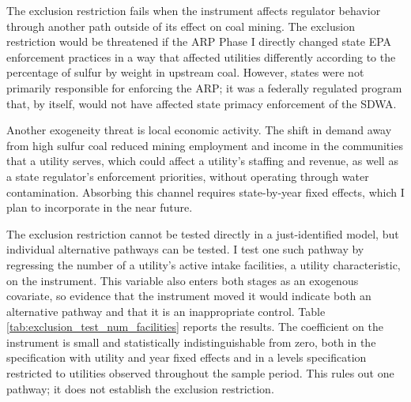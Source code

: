 \documentclass[12pt]{article}
\begin{document}

The exclusion restriction fails when the instrument affects regulator behavior through another path outside of its effect on coal mining. The exclusion restriction would be threatened if the ARP Phase I directly changed state EPA enforcement practices in a way that affected utilities differently according to the percentage of sulfur by weight in upstream coal. However, states were not primarily responsible for enforcing the ARP; it was a federally regulated program that, by itself, would not have affected state primacy enforcement of the SDWA. 

Another exogeneity threat is local economic activity. The shift in demand away from high sulfur coal reduced mining employment and income in the communities that a utility serves, which could affect a utility's staffing and revenue, as well as a state regulator's enforcement priorities, without operating through water contamination. Absorbing this channel requires state-by-year fixed effects, which I plan to incorporate in the near future.

The exclusion restriction cannot be tested directly in a just-identified model, but individual alternative pathways can be tested. I test one such pathway by regressing the number of a utility's active intake facilities, a utility characteristic, on the instrument. This variable also enters both stages as an exogenous covariate, so evidence that the instrument moved it would indicate both an alternative pathway and that it is an inappropriate control. Table \ref{tab:exclusion_test_num_facilities} reports the results. The coefficient on the instrument is small and statistically indistinguishable from zero, both in the specification with utility and year fixed effects and in a levels specification restricted to utilities observed throughout the sample period. This rules out one pathway; it does not establish the exclusion restriction.
\end{document}
